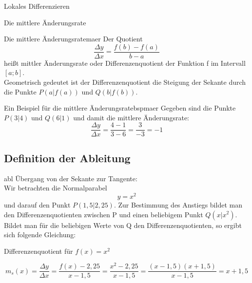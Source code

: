 \documentclass[a4paper]{report}
\begin{document}
\begin{section}{Lokales Differenzieren}
\begin{subsection}{Die mittlere Änderungsrate}
\begin{defi}{Die mittlere Änderungsrate}{maer}
Der Quotient $$\dfrac{\Delta y}{\Delta x} = \dfrac{f(b) - f(a)}{b - a}$$ heißt mittler Änderungsrate oder Differenzenquotient der Funktion f im Intervall $\left[a;b\right]$.\\
Geometrisch gedeutet ist der Differenzenquotient  die Steigung der Sekante durch die Punkte $P(a|f(a))$ und $Q(b|f(b))$.
\end{defi}
\begin{bsp}{Ein Beispiel für die mittlere Änderungsrate}{bspmaer}
Gegeben sind die Punkte $P(3|4)$ und $Q(6|1)$ und damit die mittlere Änderungsrate: $$ \dfrac{\Delta y}{\Delta x} = \dfrac{4-1}{3-6} = \dfrac{3}{-3} = -1$$
\end{bsp}
\end{subsection}

\subsection{Definition der Ableitung}{abl}
Übergang von der Sekante zur Tangente:\\
Wir betrachten die Normalparabel $$ y=x^2 $$ und darauf den Punkt $P(1,5|2,25)$. Zur Bestimmung des Anstiegs bildet man den Differenzenquotienten zwischen P und einen beliebigem Punkt $Q(x|x^2)$. Bildet man für die beliebigen Werte von Q den Differenzenquotienten, so ergibt sich folgende Gleichung: 
\begin{bsp*}{Differenzenquotient für $f(x) =x^2 $}
  
  $$ m_s(x)= \dfrac{\Delta y}{\Delta x} = \dfrac{f(x) - 2,25}{x - 1,5} = \dfrac{x^2 - 2,25}{x- 1,5} = \dfrac{(x-1,5)(x+1,5)}{x-1,5} =x+1,5 $$


\end{bsp*}
\end{section}
\end{document}
